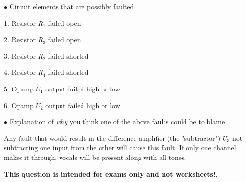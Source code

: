 \medskip
\goodbreak
\item{$\bullet$} Circuit elements that are possibly faulted
\item{1.} Resistor $R_1$ failed open
\item{2.} Resistor $R_3$ failed open
\item{3.} Resistor $R_2$ failed shorted
\item{4.} Resistor $R_4$ failed shorted
\item{5.} Opamp $U_1$ output failed high or low
\item{6.} Opamp $U_2$ output failed high or low
\medskip

\medskip
\goodbreak
\item{$\bullet$} Explanation of {\it why} you think one of the above faults could be to blame
\medskip

Any fault that would result in the difference amplifier (the "subtractor") $U_3$ not subtracting one input from the other will cause this fault.  If only one channel makes it through, vocals will be present along with all tones.







{\bf This question is intended for exams only and not worksheets!}.




